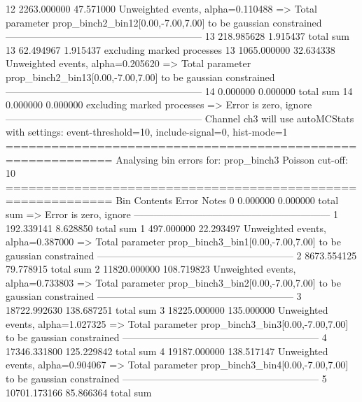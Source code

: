 12         2263.000000     47.571000       Unweighted events, alpha=0.110488
  => Total parameter prop_binch2_bin12[0.00,-7.00,7.00] to be gaussian constrained
------------------------------------------------------------
13         218.985628      1.915437        total sum                     
13         62.494967       1.915437        excluding marked processes    
13         1065.000000     32.634338       Unweighted events, alpha=0.205620
  => Total parameter prop_binch2_bin13[0.00,-7.00,7.00] to be gaussian constrained
------------------------------------------------------------
14         0.000000        0.000000        total sum                     
14         0.000000        0.000000        excluding marked processes    
  => Error is zero, ignore      
------------------------------------------------------------
Channel ch3 will use autoMCStats with settings: event-threshold=10, include-signal=0, hist-mode=1
============================================================
Analysing bin errors for: prop_binch3
Poisson cut-off: 10
============================================================
Bin        Contents        Error           Notes                         
0          0.000000        0.000000        total sum                     
  => Error is zero, ignore      
------------------------------------------------------------
1          192.339141      8.628850        total sum                     
1          497.000000      22.293497       Unweighted events, alpha=0.387000
  => Total parameter prop_binch3_bin1[0.00,-7.00,7.00] to be gaussian constrained
------------------------------------------------------------
2          8673.554125     79.778915       total sum                     
2          11820.000000    108.719823      Unweighted events, alpha=0.733803
  => Total parameter prop_binch3_bin2[0.00,-7.00,7.00] to be gaussian constrained
------------------------------------------------------------
3          18722.992630    138.687251      total sum                     
3          18225.000000    135.000000      Unweighted events, alpha=1.027325
  => Total parameter prop_binch3_bin3[0.00,-7.00,7.00] to be gaussian constrained
------------------------------------------------------------
4          17346.331800    125.229842      total sum                     
4          19187.000000    138.517147      Unweighted events, alpha=0.904067
  => Total parameter prop_binch3_bin4[0.00,-7.00,7.00] to be gaussian constrained
------------------------------------------------------------
5          10701.173166    85.866364       total sum                     

